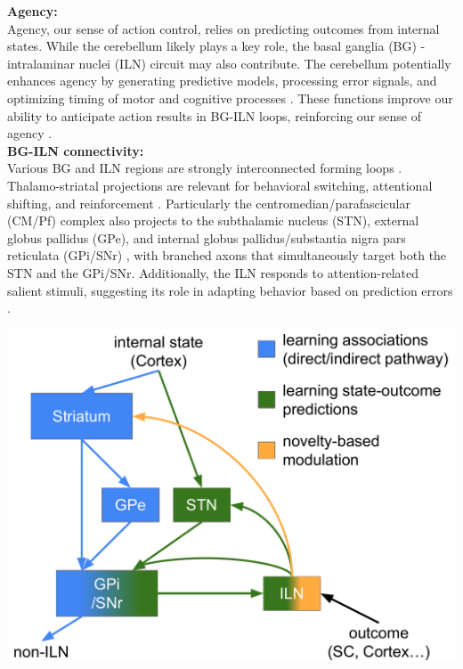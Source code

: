 \documentclass[portrait,final,a0paper,fontscale=0.30]{baposter}
\begin{document}
\begin{poster}
{\begin{adjustbox}{minipage=\textwidth, margin=2pt, center}
    \centering
    \begin{minipage}{0.26\textwidth}
        \textbf{Agency:}\\
        Agency, our sense of action control, relies on predicting outcomes from internal states. While the cerebellum likely plays a key role, the basal ganglia (BG) - intralaminar nuclei (ILN) circuit may also contribute. The cerebellum potentially enhances agency by generating predictive models, processing error signals, and optimizing timing of motor and cognitive processes \parencite{sendhilnathan2024cerebro}. These functions improve our ability to anticipate action results in BG-ILN loops, reinforcing our sense of agency \parencite{haggard2017sense}.\\
        
        \textbf{BG-ILN connectivity:}\\
        Various BG and ILN regions are strongly interconnected forming loops \parencite{cover_rostral_2021, gonzalo-martin_micropopulation_2024, smith_thalamostriatal_2014}. Thalamo-striatal projections are relevant for behavioral switching, attentional shifting, and reinforcement \parencite{smith_thalamostriatal_2014,cover_activation_2019, cover_rostral_2023}. Particularly the centromedian/parafascicular (CM/Pf) complex also projects to the subthalamic nucleus (STN), external globus pallidus (GPe), and internal globus pallidus/substantia nigra pars reticulata (GPi/SNr) \parencite{gonzalo-martin_micropopulation_2024,castle_thalamic_2005,kita_intralaminar_2016,hanini-daoud_processing_2022}, with branched axons that simultaneously target both the STN and the GPi/SNr. Additionally, the ILN responds to attention-related salient stimuli, suggesting its role in adapting behavior based on prediction errors \parencite{minamimoto_participation_2002,smith_thalamostriatal_2014}.
    \end{minipage}
    \hspace{0.01\textwidth}
    \begin{minipage}{0.25\textwidth}
        \centering
        \includegraphics[width=\textwidth]{figures/circuit_idea_1.pdf}

\end{minipage}
\end{adjustbox}}
\end{poster}
\end{document}
